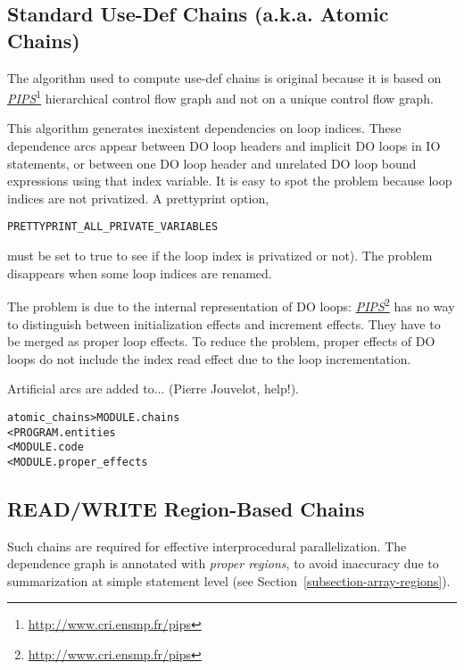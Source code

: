 \documentclass[a4paper]{report}
\newenvironment{PipsMake}{\begin{alltt}}{\end{alltt}}
\newcommand{\LINK}[2]{\href{#2}{#1}\footnote{\url{#2}}\xspace}
\newcommand{\PIPS}{\LINK{\emph{PIPS}}{http://www.cri.ensmp.fr/pips}}
\begin{document}
\subsection{Standard Use-Def Chains (a.k.a. Atomic Chains)}
\label{subsubsection-atomic-chains}

The algorithm used to compute use-def chains is original because it is
based on \PIPS{} hierarchical control flow graph and not on a unique
control flow graph.

This algorithm generates inexistent dependencies on loop indices. These
dependence arcs appear between DO loop headers and implicit DO loops in
IO statements, or between one DO loop header and unrelated DO loop bound
expressions using that index variable. It is easy to spot the problem
because loop indices are not privatized. A prettyprint option,
\begin{center}
\verb/PRETTYPRINT_ALL_PRIVATE_VARIABLES/
\end{center}
must be set to true to see if the loop index is privatized or
not). The problem disappears when some loop indices are renamed.

The problem is due to the internal representation of DO loops: \PIPS{} has
no way to distinguish between initialization effects and increment
effects. They have to be merged as proper loop effects. To reduce the
problem, proper effects of DO loops do not include the index read effect
due to the loop incrementation.

Artificial arcs are added to... (Pierre Jouvelot, help!).

\begin{PipsMake}
atomic_chains                   > MODULE.chains
        < PROGRAM.entities
        < MODULE.code
        < MODULE.proper_effects
\end{PipsMake}

\subsection{READ/WRITE Region-Based Chains}

\label{subsubsection-read-write-region-based-chains}

Such chains are required for effective interprocedural parallelization. The
dependence graph is annotated with {\em proper regions}, to avoid inaccuracy
due to summarization at simple statement level (see
Section~\ref{subsection-array-regions}).
\end{document}
